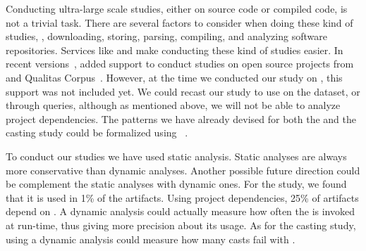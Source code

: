 Conducting ultra-large scale studies, either on source code or compiled code, is not a trivial task.
There are several factors to consider when doing these kind of studies,
\eg{}, downloading, storing, parsing, compiling,
and analyzing software repositories.
Services like \boa{} and \lgtm{} make conducting these kind of studies easier.
In recent versions~\citep{boa-github},
\boa{} added support to conduct studies on open source projects from \github{} and Qualitas Corpus~\citep{temperoQualitasCorpusCurated2010}.
However, at the time we conducted our study on \unsafe{},
this support was not included yet.
We could recast our \unsafe{} study to use \boa{} on the \github{} dataset,
or \lgtm{} through \ql{} queries, although as mentioned above,
we will not be able to analyze project dependencies.
The patterns we have already devised for both the \unsafe{} and the casting study could be formalized using \ql{}~\citep{avgustinovQLObjectorientedQueries2016}.

To conduct our studies we have used static analysis.
Static analyses are always more conservative than dynamic analyses.
Another possible future direction could be complement the static analyses with dynamic ones.
For the \unsafe{} study,
we found that it is used in 1\% of the \mavencentral{} artifacts.
Using project dependencies, 25\% of artifacts depend on \smu{}.
A dynamic analysis could actually measure how often the \unsafe{} \api{} is invoked at run-time,
thus giving more precision about its usage.
As for the casting study,
using a dynamic analysis could measure how many casts fail with .


